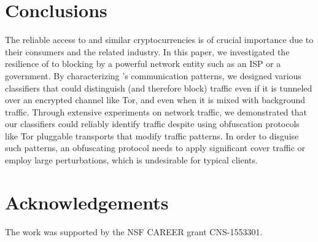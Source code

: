 \section{Conclusions}

The reliable access to \bc and similar cryptocurrencies is of crucial importance due to
their consumers and the related industry. 
In this paper, we investigated the resilience of \bc to blocking by a powerful network entity such as an ISP or a government.
By characterizing \bc's communication patterns, we designed 
various classifiers that could distinguish (and therefore block) \bc traffic 
even if it is tunneled over an encrypted channel like Tor, 
and even when it is mixed with background traffic. Through extensive experiments on network traffic, we demonstrated that our classifiers could reliably identify \bc traffic despite using obfuscation protocols like Tor pluggable transports that modify traffic patterns. In order to disguise such patterns, an obfuscating protocol needs to apply significant cover traffic or employ large perturbations, which is undesirable for typical clients. 

 
\section*{Acknowledgements}
The work was supported by the NSF CAREER grant CNS-1553301.




